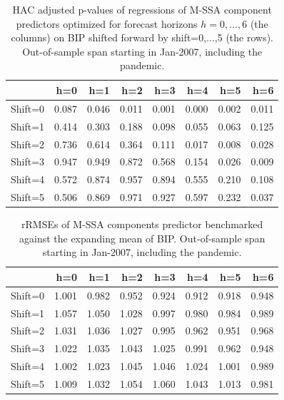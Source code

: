 \documentclass[a4paper]{article}
\begin{document}
\begin{table}[ht]
\centering
\begin{tabular}{rrrrrrrr}
  \hline
 & h=0 & h=1 & h=2 & h=3 & h=4 & h=5 & h=6 \\ 
  \hline
Shift=0 & 0.087 & 0.046 & 0.011 & 0.001 & 0.000 & 0.002 & 0.011 \\ 
  Shift=1 & 0.414 & 0.303 & 0.188 & 0.098 & 0.055 & 0.063 & 0.125 \\ 
  Shift=2 & 0.736 & 0.614 & 0.364 & 0.111 & 0.017 & 0.008 & 0.028 \\ 
  Shift=3 & 0.947 & 0.949 & 0.872 & 0.568 & 0.154 & 0.026 & 0.009 \\ 
  Shift=4 & 0.572 & 0.874 & 0.957 & 0.894 & 0.555 & 0.210 & 0.108 \\ 
  Shift=5 & 0.506 & 0.869 & 0.971 & 0.927 & 0.597 & 0.232 & 0.037 \\ 
   \hline
\end{tabular}
\caption{HAC adjusted p-values of regressions of M-SSA component predictors optimized for forecast horizons $h=0,...,6$  (the columns) on BIP shifted forward by shift=0,...,5 (the rows). Out-of-sample span starting in Jan-2007, including the pandemic.} 
\label{p_val1}
\end{table}%
\begin{table}[ht]
\centering
\begin{tabular}{rrrrrrrr}
  \hline
 & h=0 & h=1 & h=2 & h=3 & h=4 & h=5 & h=6 \\ 
  \hline
Shift=0 & 1.001 & 0.982 & 0.952 & 0.924 & 0.912 & 0.918 & 0.948 \\ 
  Shift=1 & 1.057 & 1.050 & 1.028 & 0.997 & 0.980 & 0.984 & 0.989 \\ 
  Shift=2 & 1.031 & 1.036 & 1.027 & 0.995 & 0.962 & 0.951 & 0.968 \\ 
  Shift=3 & 1.022 & 1.035 & 1.043 & 1.025 & 0.991 & 0.962 & 0.948 \\ 
  Shift=4 & 1.002 & 1.023 & 1.045 & 1.046 & 1.024 & 1.001 & 0.989 \\ 
  Shift=5 & 1.009 & 1.032 & 1.054 & 1.060 & 1.043 & 1.013 & 0.981 \\ 
   \hline
\end{tabular}
\caption{rRMSEs of M-SSA components predictor benchmarked against the expanding mean of BIP. Out-of-sample span starting in Jan-2007, including the pandemic.} 
\label{rRMSE_mSSA_comp_mean2}
\end{table}%
\end{document}
